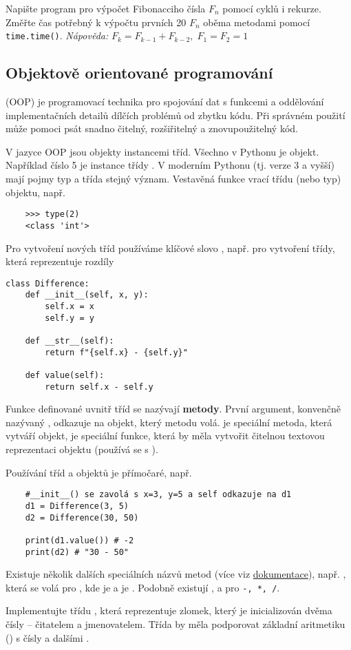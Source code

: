 \begin{exercise}
    Napište program pro výpočet Fibonacciho čísla $F_n$ pomocí cyklů i rekurze. Změřte čas potřebný k výpočtu prvních 20 $F_n$ oběma metodami pomocí \verb|time.time()|.
    \emph{Nápověda:} $F_k = F_{k-1} + F_{k-2},\;F_1 = F_2 = 1$
\end{exercise}

\subsection{Objektově orientované programování}
    (OOP) je programovací technika pro spojování dat s funkcemi a oddělování implementačních detailů dílčích problémů od zbytku kódu. Při správném použití může pomoci psát snadno čitelný, rozšiřitelný a znovupoužitelný kód.

    V jazyce OOP jsou objekty instancemi tříd. Všechno v Pythonu je objekt. Například číslo 5 je instance třídy . V moderním Pythonu (tj. verze 3 a vyšší) mají pojmy typ a třída stejný význam. Vestavěná funkce  vrací třídu (nebo typ) objektu, např.
\begin{lstlisting}
    >>> type(2)
    <class 'int'>
\end{lstlisting}

    Pro vytvoření nových tříd používáme klíčové slovo , např. pro vytvoření třídy, která reprezentuje rozdíly
\begin{lstlisting}
class Difference:
    def __init__(self, x, y):
        self.x = x
        self.y = y
        
    def __str__(self):
        return f"{self.x} - {self.y}"
    
    def value(self):
        return self.x - self.y
\end{lstlisting}
    Funkce definované uvnitř tříd se nazývají \textbf{metody}. První argument, konvenčně nazývaný , odkazuje na objekt, který metodu volá.  je speciální metoda, která vytváří objekt,  je speciální funkce, která by měla vytvořit čitelnou textovou reprezentaci objektu (používá se s ).

    Používání tříd a objektů je přímočaré, např.
\begin{lstlisting}
    #__init__() se zavolá s x=3, y=5 a self odkazuje na d1
    d1 = Difference(3, 5)
    d2 = Difference(30, 50) 

    print(d1.value()) # -2
    print(d2) # "30 - 50"
\end{lstlisting}

Existuje několik dalších speciálních názvů metod (více viz \href{https://docs.python.org/3/reference/datamodel.html#emulating-numeric-types}{dokumentace}),
např. , která se volá pro , kde  je  a  je . Podobně existují ,  a  pro \verb|-, *, /|.

\begin{exercise}
    Implementujte třídu , která reprezentuje zlomek, který je inicializován dvěma čísly -- čitatelem a jmenovatelem. Třída by měla podporovat základní aritmetiku (\ls{+,-,*,/}) s čísly a dalšími .
\end{exercise}